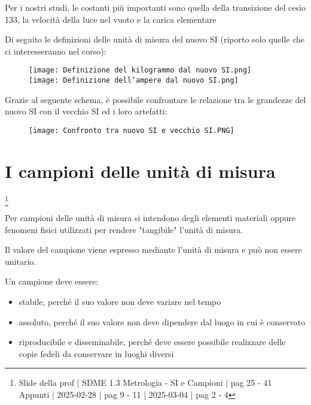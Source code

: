\begin{tcolorbox}
    Per i nostri studi, 
    le costanti più importanti sono quella della transizione del cesio 133, 
    la velocità della luce nel vuoto e 
    la carica elementare
\end{tcolorbox}

\newpage 

Di seguito le definizioni delle unità di misura del nuovo SI (riporto solo quelle che ci interesseranno nel corso): 

\begin{figure}[h]
    \centering
    \texttt{[image: Definizione del kilogrammo dal nuovo SI.png]}
    \\
    \texttt{[image: Definizione dell'ampere dal nuovo SI.png]}
\end{figure}

Grazie al seguente schema, 
è possibile confrontare le relazione tra le grandezze del nuovo SI con il vecchio SI ed i loro artefatti: 

\begin{figure}[h]
    \centering
    \texttt{[image: Confronto tra nuovo SI e vecchio SI.PNG]}
\end{figure}

\newpage 

\section{I campioni delle unità di misura}
\footnote{Slide della prof | SDME 1.3 Metrologia - SI e Campioni | pag 25 - 41 \\  
Appunti | 2025-02-28 | pag 9 - 11 | 2025-03-04 | pag 2 - 4}

Per campioni delle unità di misura si intendono degli elementi materiali oppure fenomeni fisici utilizzati per rendere "tangibile" l'unità di misura. \newline 

Il valore del campione viene espresso mediante l'unità di misura e può non essere unitario. \newline 

Un campione deve essere: 

\begin{itemize}
    \item stabile, perché il suo valore non deve variare nel tempo 
    \item assoluto, perché il suo valore non deve dipendere dal luogo in cui è conservato 
    \item riproducibile e disseminabile, perché deve essere possibile realizzare delle copie fedeli da conservare in luoghi diversi
\end{itemize}

